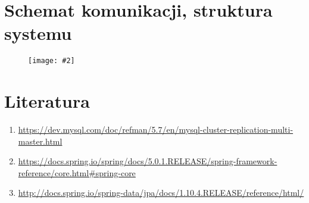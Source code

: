 \documentclass[a4paper,11pt]{article}
\newcommand{\pictureframe}[2]{
	\begin{figure}[H]
		\begin{center}
			\texttt{[image: \#2]}
		\end{center}
	\end{figure}
}
\begin{document}
\section{Schemat komunikacji, struktura systemu}
\pictureframe{15cm}{Schemat.png}
\section{Literatura}
\begin{enumerate}
	\item \url{https://dev.mysql.com/doc/refman/5.7/en/mysql-cluster-replication-multi-master.html}
	\item \url{https://docs.spring.io/spring/docs/5.0.1.RELEASE/spring-framework-reference/core.html#spring-core}
	\item \url{http://docs.spring.io/spring-data/jpa/docs/1.10.4.RELEASE/reference/html/}
\end{enumerate}
\end{document}
